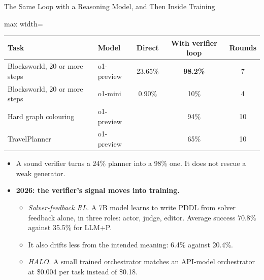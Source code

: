 \begin{frame}{The Same Loop with a Reasoning Model, and Then Inside Training}
    \begin{center}
    \small
    \begin{adjustbox}{max width=\linewidth}\begin{tabular}{llccc}
        \toprule
        \textbf{Task} & \textbf{Model} & \textbf{Direct} & \textbf{With verifier loop} & \textbf{Rounds} \\
        \midrule
        \rowcolor{KAUSTcyan!12} Blocksworld, 20 or more steps & o1-preview & 23.65\% & \textbf{98.2\%} & 7 \\
        Blocksworld, 20 or more steps & o1-mini & 0.90\% & 10\% & 4 \\
        Hard graph colouring & o1-preview & & 94\% & 10 \\
        TravelPlanner & o1-preview & & 65\% & 10 \\
        \bottomrule
    \end{tabular}\end{adjustbox}
    \end{center}
    \begin{itemize}\itemsep0.4em
        \item A sound verifier turns a 24\% planner into a 98\% one. It does not rescue a weak generator.
        \item \textbf{2026: the verifier's signal moves into training.}
        \begin{itemize}\itemsep0.15em
            \item \emph{Solver-feedback RL.} A 7B model learns to write PDDL from solver feedback alone, in three roles: actor, judge, editor. Average success 70.8\% against 35.5\% for LLM+P.
            \item It also drifts less from the intended meaning: 6.4\% against 20.4\%.
            \item \emph{HALO.} A small trained orchestrator matches an API-model orchestrator at \$0.004 per task instead of \$0.18.
        \end{itemize}
    \end{itemize}
\end{frame}


